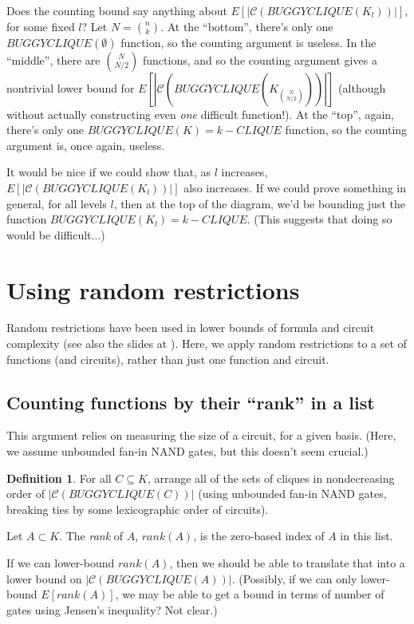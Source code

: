 \documentclass[12pt]{article}
\theoremstyle{definition}
\newtheorem{defn}{Definition}[section]
\newcommand{\bigC}[0]{\mathcal{C}}
\begin{document}
Does the counting bound
say anything about $E[|\bigC(BUGGYCLIQUE(K_l))|]$, for
some fixed $l$? Let $N = {n \choose k}$.
At the ``bottom'', there's only one $BUGGYCLIQUE(\emptyset)$
function, so the counting argument is useless.
In the ``middle'',
there are ${N \choose {N/2}}$ functions, and so the counting
argument gives a nontrivial lower bound for
$E[|\bigC(BUGGYCLIQUE(K_{N \choose {N/2}}))|]$ (although
without actually constructing even {\em one} difficult function!).
At the ``top'', again, there's only one $BUGGYCLIQUE(K) = k-CLIQUE$
function, so the counting argument is, once again, useless.

It would be nice if we could show that, as $l$ increases,
$E[|\bigC(BUGGYCLIQUE(K_l))|]$ also increases.
If we could prove something in general, for all levels $l$, then at
the top of the diagram, we'd be bounding just the function
$BUGGYCLIQUE(K_l) = k-CLIQUE$. (This suggests that doing so would
be difficult...)


\section{Using random restrictions}

Random restrictions have been used in lower bounds of formula
\cite{subbotovskaya1963comparison} and circuit \cite{hastad1987lower}
complexity (see also the slides at \cite{rossmanRestrictions}).
Here, we apply random restrictions to a set of functions (and circuits),
rather than just one function and circuit.

\subsection{Counting functions by their ``rank'' in a list}

This argument relies on measuring the size of a circuit,
for a given basis. (Here, we assume unbounded fan-in
NAND gates, but this doesn't seem crucial.)

\begin{defn}
\label{Rank}
For all $C \subseteq K$,
arrange all of the sets of cliques in nondecreasing order
of $|\bigC(BUGGYCLIQUE(C))|$ (using unbounded fan-in NAND gates,
breaking ties by some lexicographic order of circuits).

Let $A \subset K$. The {\em rank} of $A$, $rank(A)$, is the zero-based
index of $A$ in this list.
\end{defn}

If we can lower-bound $rank(A)$, then we should be able to translate
that into a
lower bound on $|\bigC(BUGGYCLIQUE(A))|$. (Possibly, if we
can only lower-bound $E[rank(A)]$, we may be able to get
a bound in terms of number of gates using Jensen's inequality?
Not clear.)
\end{document}
